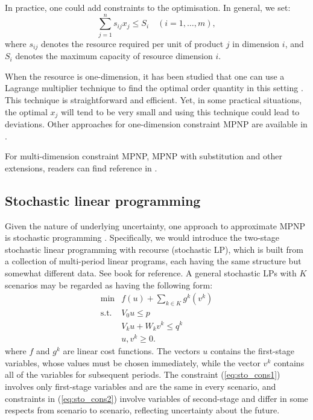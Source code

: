 \documentclass[a4paper,11pt]{article}
\begin{document}
In practice, one could add constraints to the optimisation. In general, we set:
\[
    \sum_{j=1}^n s_{ij} x_j \le S_i	\quad (i = 1, \ldots, m),
\]
where $s_{ij}$ denotes the resource required per unit of product $j$ in dimension $i$, and $S_i$ denotes the maximum capacity of resource dimension $i$.

When the resource is one-dimension, it has been studied that one can use a Lagrange multiplier technique to find the optimal order quantity in this setting \cite{HW63}. This technique is straightforward and efficient. Yet, in some practical situations, the optimal $x_j$ will tend to be very small and using this technique could lead to deviations. Other approaches for one-dimension constraint MPNP are available in \cite{ALM05,NS84,ZXH09,Zh10}.

For multi-dimension constraint MPNP, MPNP with substitution and other extensions, readers can find reference in \cite{BAA99,BR93,CVW14,LL95,MS78}. 

\subsection{Stochastic linear programming}
Given the nature of underlying uncertainty, one approach to approximate MPNP is stochastic programming \cite{Bea55,D98}. Specifically, we would introduce the two-stage stochastic linear programming with recourse (stochastic LP), which is built from a collection of multi-period linear programs, each having the same structure but somewhat different data. See book \cite{HS13,KM76,KWK94,Pf12} for reference. A general stochastic LPs with $K$ scenarios may be regarded as having the following form:
\begin{eqnarray}
\label{eq:sto_obj}
    \min	& f ( u ) + \sum_{k \in K} g^k ( v^k )\\
\label{eq:sto_cons1}
	\text{s.t.}    & V_0 u \leq p\\
\label{eq:sto_cons2}
	& V_k u +W_k v^k \leq q^k\\
\label{eq:sto_posi}
	& u, v^k \geq 0.
\end{eqnarray}
where $f$ and $g^k$ are linear cost functions. The vectors $u$ contains the first-stage variables, whose values must be chosen immediately, while the vector $v^k$ contains all of the variables for subsequent periods. The constraint (\ref{eq:sto_cons1}) involves only first-stage variables and are the same in every scenario, and constraints in (\ref{eq:sto_cons2}) involve variables of second-stage and differ in some respects from scenario to scenario, reflecting uncertainty about the future.
\end{document}
